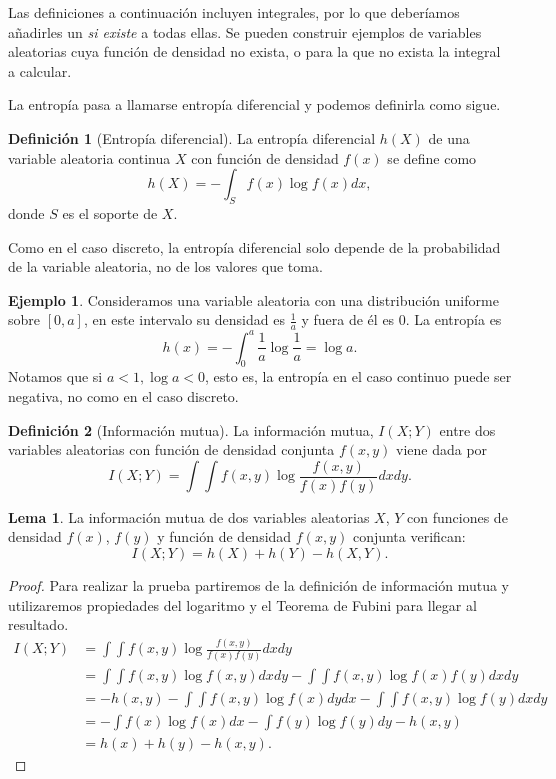 \documentclass[10pt,a4paper]{article} %
\theoremstyle{definition}
\newtheorem{definition}{Definición}[section]
\newtheorem{lemma}[theorem]{Lema}
\newtheorem{example}[theorem]{Ejemplo}
\begin{document}
Las definiciones a continuación incluyen integrales, por lo que deberíamos añadirles un \textit{si existe} a todas ellas. Se pueden construir ejemplos de variables aleatorias cuya función de densidad no exista, o para la que no exista la integral a calcular.

La entropía pasa a llamarse entropía diferencial y podemos definirla como sigue.

\begin{definition}[Entropía diferencial]
  La entropía diferencial $h(X)$ de una variable aleatoria continua $X$ con función de densidad $f(x)$ se define como\[
h(X) = - \int_Sf(x)\log f(x)dx,
\]
donde $S$ es el soporte de $X$.
\end{definition}
Como en el caso discreto, la entropía diferencial solo depende de la probabilidad de la variable aleatoria, no de los valores que toma. 

\begin{example} Consideramos una variable aleatoria con una distribución uniforme sobre $[0,a]$, en este intervalo su densidad es $\frac{1}{a}$ y fuera de él es 0. La entropía es \[
h(x) = - \int_0^a\frac{1}{a}\log\frac{1}{a} = \log a.
  \]
Notamos que si $a<1, \log a < 0$, esto es, la entropía en el caso continuo puede ser negativa, no como en el caso discreto.
  
\end{example}

\begin{definition}[Información mutua]
  La información mutua, $I(X;Y)$ entre dos variables aleatorias con función de densidad conjunta $f(x,y)$ viene dada por\[
I(X;Y) = \int \int f(x,y) \log \frac{f(x,y)}{f(x)f(y)}dxdy.
  \]
\end{definition}

\begin{lemma}
  La información mutua de dos variables aleatorias $X$, $Y$ con funciones de densidad $f(x)$, $f(y)$ y función de densidad $f(x,y)$ conjunta verifican:\[
  I(X;Y) = h(X) + h(Y) - h(X,Y).
  \]
\end{lemma}

\begin{proof}
  Para realizar la prueba partiremos de la definición de información mutua y utilizaremos propiedades del logaritmo y el Teorema de Fubini para llegar al resultado.
  \begin{align*}
    I(X;Y) &= \int \int f(x,y) \log \frac{f(x,y)}{f(x)f(y)}dxdy \\
    &= \int \int f(x,y) \log f(x,y)dxdy - \int \int f(x,y) \log f(x)f(y)dxdy\\
    &= -h(x,y)-\int\int f(x,y) \log f(x) dy dx - \int \int f(x,y)\log f(y)dxdy\\
    &= -\int f(x) \log f(x)dx - \int f(y)\log f(y) dy -h(x,y)\\
    &= h(x) + h(y) - h(x,y).
  \end{align*}
\end{proof}
\end{document}
